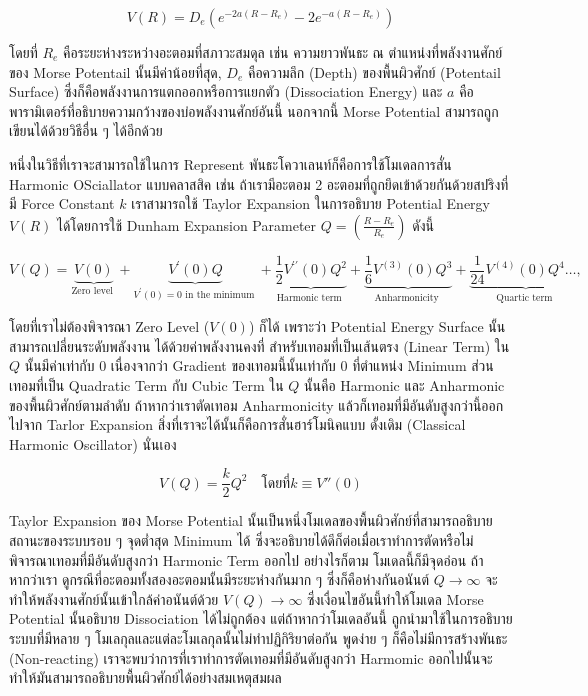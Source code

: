 \begin{equation}
    \label{eq:potential_bond_stretch}
    V(R) = D_{e} \left( e^{-2a(R-R_{e})} -2e^{-a(R-R_{e})} \right)
\end{equation}

\noindent โดยที่ $R_{e}$ คือระยะห่างระหว่างอะตอมที่สภาวะสมดุล เช่น ความยาวพันธะ ณ ตำแหน่งที่พลังงานศักย์ของ Morse Potentail
นั้นมีค่าน้อยที่สุด, $D_{e}$ คือความลึก (Depth) ของพื้นผิวศักย์ (Potentail Surface) ซึ่งก็คือพลังงานการแตกออกหรือการแยกตัว (Dissociation
Energy) และ $a$ คือพารามิเตอร์ที่อธิบายความกว้างของบ่อพลังงานศักย์อันนี้ นอกจากนี้ Morse Potential สามารถถูกเขียนได้ด้วยวิธีอื่น ๆ ได้อีกด้วย

หนึ่งในวิธีที่เราจะสามารถใช้ในการ Represent พันธะโควาเลนท์ก็คือการใช้โมเดลการสั่น Harmonic OSciallator แบบคลาสสิค
เช่น ถ้าเรามีอะตอม 2 อะตอมที่ถูกยึดเข้าด้วยกันด้วยสปริงที่มี Force Constant $k$ เราสามารถใช้ Taylor Expansion ในการอธิบาย Potential
Energy $V(R)$ ได้โดยการใช้ Dunham Expansion Parameter $Q = (\frac{R-R_{e}}{R_{e}})$ ดังนี้

\begin{equation}
    V(Q)
    =
    \underbrace{V(0)}_{\text {Zero level }}
    + \underbrace{V^{\prime}(0) Q}_{V^{\prime}(0)=0 \text { in the minimum }}
    + \underbrace{\frac{1}{2} V^{\prime \prime}(0) Q^2}_{\text {Harmonic term }}
    + \underbrace{\frac{1}{6} V^{(3)}(0) Q^3}_{\text {Anharmonicity }}
    + \underbrace{\frac{1}{24} V^{(4)}(0) Q^4 \ldots,}_{\text {Quartic term }}
\end{equation}

\noindent โดยที่เราไม่ต้องพิจารณา Zero Level ($V(0)$) ก็ได้ เพราะว่า Potential Energy Surface นั้นสามารถเปลี่ยนระดับพลังงาน%
ได้ด้วยค่าพลังงานคงที่ สำหรับเทอมที่เป็นเส้นตรง (Linear Term) ใน $Q$ นั้นมีค่าเท่ากับ 0 เนื่องจากว่า Gradient ของเทอมนี้นั้นเท่ากับ 0
ที่ตำแหน่ง Minimum ส่วนเทอมที่เป็น Quadratic Term กับ Cubic Term ใน $Q$ นั้นคือ Harmonic และ Anharmonic ของพื้นผิวศักย์ตามลำดับ
ถ้าหากว่าเราตัดเทอม Anharmonicity แล้วก็เทอมที่มีอันดับสูงกว่านี้ออกไปจาก Tarlor Expansion สิ่งที่เราจะได้นั้นก็คือการสั่นฮาร์โมนิคแบบ%
ดั้งเดิม (Classical Harmonic Oscillator) นั่นเอง

\begin{equation}
    V(Q)
    =
    \frac{k}{2} Q^{2} \quad \texttt{โดยที่} k \equiv V''(0)
\end{equation}

Taylor Expansion ของ Morse Potential นั้นเป็นหนึ่งโมเดลของพื้นผิวศักย์ที่สามารถอธิบายสถานะของระบบรอบ ๆ จุดต่ำสุด Minimum ได้
ซึ่งจะอธิบายได้ดีก็ต่อเมื่อเราทำการตัดหรือไม่พิจารณาเทอมที่มีอันดับสูงกว่า Harmonic Term ออกไป อย่างไรก็ตาม โมเดลนี้ก็มีจุดอ่อน ถ้าหากว่าเรา%
ดูกรณีที่อะตอมทั้งสองอะตอมนั้นมีระยะห่างกันมาก ๆ ซึ่งก็คือห่างกันอนันต์ $Q \rightarrow \infty$ จะทำให้พลังงานศักย์นั้นเข้าใกล้ค่าอนันต์ด้วย
$V(Q) \rightarrow \infty$ ซึ่งเงื่อนไขอันนี้ทำให้โมเดล Morse Potential นั้นอธิบาย Dissociation ได้ไม่ถูกต้อง แต่ถ้าหากว่าโมเดลอันนี้%
ถูกนำมาใช้ในการอธิบายระบบที่มีหลาย ๆ โมเลกุลและแต่ละโมเลกุลนั้นไม่ทำปฏิกิริยาต่อกัน พูดง่าย ๆ ก็คือไม่มีการสร้างพันธะ (Non-reacting)
เราจะพบว่าการที่เราทำการตัดเทอมที่มีอันดับสูงกว่า Harmomic ออกไปนั้นจะทำให้มันสามารถอธิบายพื้นผิวศักย์ได้อย่างสมเหตุสมผล

